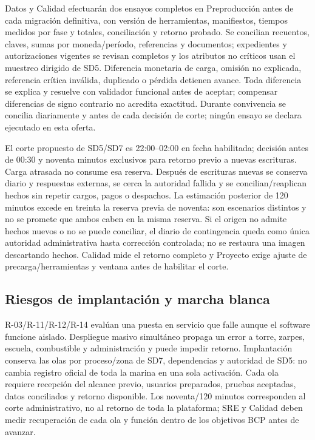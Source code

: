 Datos y Calidad efectuarán dos ensayos completos en Preproducción antes de cada migración definitiva, con versión de herramientas, manifiestos, tiempos medidos por fase y totales, conciliación y retorno probado. Se concilian recuentos, claves, sumas por moneda/período, referencias y documentos; expedientes y autorizaciones vigentes se revisan completos y los atributos no críticos usan el muestreo dirigido de SD5. Diferencia monetaria de carga, omisión no explicada, referencia crítica inválida, duplicado o pérdida detienen avance. Toda diferencia se explica y resuelve con validador funcional antes de aceptar; compensar diferencias de signo contrario no acredita exactitud. Durante convivencia se concilia diariamente y antes de cada decisión de corte; ningún ensayo se declara ejecutado en esta oferta.

El corte propuesto de SD5/SD7 es 22:00--02:00 en fecha habilitada; decisión antes de 00:30 y noventa minutos exclusivos para retorno previo a nuevas escrituras. Carga atrasada no consume esa reserva. Después de escrituras nuevas se conserva diario y respuestas externas, se cerca la autoridad fallida y se concilian/reaplican hechos sin repetir cargos, pagos o despachos. La estimación posterior de 120 minutos excede en treinta la reserva previa de noventa: son escenarios distintos y no se promete que ambos caben en la misma reserva. Si el origen no admite hechos nuevos o no se puede conciliar, el diario de contingencia queda como única autoridad administrativa hasta corrección controlada; no se restaura una imagen descartando hechos. Calidad mide el retorno completo y Proyecto exige ajuste de precarga/herramientas y ventana antes de habilitar el corte. \parencite[numeral 17.6]{sd8-c07}

\subsection{Riesgos de implantación y marcha blanca}\label{sec:sd8-implantacion-p05}
R-03/R-11/R-12/R-14 evalúan una puesta en servicio que falle aunque el software funcione aislado. Despliegue masivo simultáneo propaga un error a torre, zarpes, escuela, combustible y administración y puede impedir retorno. Implantación conserva las olas por proceso/zona de SD7, dependencias y autoridad de SD5: no cambia registro oficial de toda la marina en una sola activación. Cada ola requiere recepción del alcance previo, usuarios preparados, pruebas aceptadas, datos conciliados y retorno disponible. Los noventa/120 minutos corresponden al corte administrativo, no al retorno de toda la plataforma; SRE y Calidad deben medir recuperación de cada ola y función dentro de los objetivos BCP antes de avanzar. \parencites[RT-20.01--02; p.~35]{sd8-bt}[numeral 13.3]{sd8-c07}

